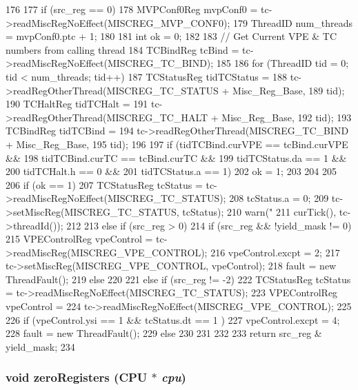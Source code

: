 \begin{DoxyCode}
176 {
177     if (src_reg == 0) {
178         MVPConf0Reg mvpConf0 = tc->readMiscRegNoEffect(MISCREG_MVP_CONF0);
179         ThreadID num_threads = mvpConf0.ptc + 1;
180 
181         int ok = 0;
182 
183         // Get Current VPE & TC numbers from calling thread
184         TCBindReg tcBind = tc->readMiscRegNoEffect(MISCREG_TC_BIND);
185 
186         for (ThreadID tid = 0; tid < num_threads; tid++) {
187             TCStatusReg tidTCStatus =
188                 tc->readRegOtherThread(MISCREG_TC_STATUS + Misc_Reg_Base,
189                                        tid);
190             TCHaltReg tidTCHalt =
191                 tc->readRegOtherThread(MISCREG_TC_HALT + Misc_Reg_Base,
192                                        tid);
193             TCBindReg tidTCBind =
194                 tc->readRegOtherThread(MISCREG_TC_BIND + Misc_Reg_Base,
195                                        tid);
196 
197             if (tidTCBind.curVPE == tcBind.curVPE &&
198                 tidTCBind.curTC == tcBind.curTC &&
199                 tidTCStatus.da == 1 &&
200                 tidTCHalt.h == 0    &&
201                 tidTCStatus.a == 1) {
202                 ok = 1;
203             }
204         }
205 
206         if (ok == 1) {
207             TCStatusReg tcStatus = tc->readMiscRegNoEffect(MISCREG_TC_STATUS);
208             tcStatus.a = 0;
209             tc->setMiscReg(MISCREG_TC_STATUS, tcStatus);
210             warn("%
211                     curTick(), tc->threadId());
212         }
213     } else if (src_reg > 0) {
214         if (src_reg && !yield_mask != 0) {
215             VPEControlReg vpeControl = tc->readMiscReg(MISCREG_VPE_CONTROL);
216             vpeControl.excpt = 2;
217             tc->setMiscReg(MISCREG_VPE_CONTROL, vpeControl);
218             fault = new ThreadFault();
219         } else {
220         }
221     } else if (src_reg != -2) {
222         TCStatusReg tcStatus = tc->readMiscRegNoEffect(MISCREG_TC_STATUS);
223         VPEControlReg vpeControl =
224             tc->readMiscRegNoEffect(MISCREG_VPE_CONTROL);
225 
226         if (vpeControl.ysi == 1 && tcStatus.dt == 1 ) {
227             vpeControl.excpt = 4;
228             fault = new ThreadFault();
229         } else {
230         }
231     }
232 
233     return src_reg & yield_mask;
234 }
\end{DoxyCode}
\hypertarget{namespaceMipsISA_a2f96efaaa88b587ab5b29ded7264960e}{
\subsubsection[{zeroRegisters}]{\setlength{\rightskip}{0pt plus 5cm}void zeroRegisters (CPU $\ast$ {\em cpu})}}
\label{namespaceMipsISA_a2f96efaaa88b587ab5b29ded7264960e}



